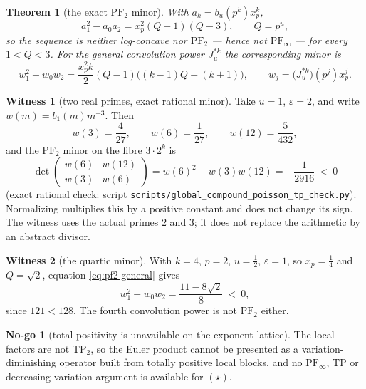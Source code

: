 \documentclass[11pt]{amsart}
\newtheorem{theorem}{Theorem}[section]
\theoremstyle{definition}
\theoremstyle{remark}
\theoremstyle{definition}
\newtheorem{nogo}{No-go}[section]
\newtheorem{witness}{Witness}[section]
\newcommand{\half}{\tfrac{1}{2}}
\newcommand{\eps}{\varepsilon}
\begin{document}
\begin{theorem}[the exact $\mathrm{PF}_2$ minor]\label{thm:pf2}
With $a_k=b_u(p^k)x_p^k$,
\begin{equation}\label{eq:pf2}
   a_1^2-a_0a_2=x_p^2(Q-1)(Q-3),\qquad Q=p^u ,
\end{equation}
so the sequence is neither log-concave nor $\mathrm{PF}_2$ --- hence not
$\mathrm{PF}_\infty$ --- for every $1<Q<3$. For the general convolution power $J_u^{*k}$ the
corresponding minor is
\begin{equation}\label{eq:pf2-general}
   w_1^2-w_0w_2=\frac{x_p^2k}{2}(Q-1)\bigl((k-1)Q-(k+1)\bigr),
   \qquad w_j=\bigl(J_u^{*k}\bigr)(p^j)x_p^j .
\end{equation}
\end{theorem}

\begin{witness}[two real primes, exact rational minor]\label{wit:pf2}
Take $u=1$, $\eps=2$, and write $w(m)=b_1(m)m^{-3}$. Then
\[
   w(3)=\frac{4}{27},\qquad w(6)=\frac{1}{27},\qquad w(12)=\frac{5}{432},
\]
and the $\mathrm{PF}_2$ minor on the fibre $3\cdot2^k$ is
\begin{equation}\label{eq:pf2-witness}
   \det\begin{pmatrix}w(6)&w(12)\\ w(3)&w(6)\end{pmatrix}
   =w(6)^2-w(3)w(12)=-\frac{1}{2916}\ <\ 0 
\end{equation}
(exact rational check: script \texttt{scripts/global\_compound\_poisson\_tp\_check.py}).
Normalizing multiplies this by a positive constant and does not change its sign. The witness uses
the actual primes $2$ and $3$; it does not replace the arithmetic by an abstract divisor.
\end{witness}

\begin{witness}[the quartic minor]\label{wit:pf2-quartic}
With $k=4$, $p=2$, $u=\half$, $\eps=1$, so $x_p=\tfrac14$ and $Q=\sqrt2$, equation
\eqref{eq:pf2-general} gives
\begin{equation}\label{eq:pf2-quartic}
   w_1^2-w_0w_2=\frac{11-8\sqrt2}{8}\ <\ 0 ,
\end{equation}
since $121<128$. The fourth convolution power is not $\mathrm{PF}_2$ either.
\end{witness}

\begin{nogo}[total positivity is unavailable on the exponent lattice]\label{ng:pf2}
The local factors are not $\mathrm{TP}_2$, so the Euler product cannot be presented as a
variation-diminishing operator built from totally positive local blocks, and no
$\mathrm{PF}_\infty$, $\mathrm{TP}$ or decreasing-variation argument is available for $(\star)$.
\end{nogo}
\end{document}
